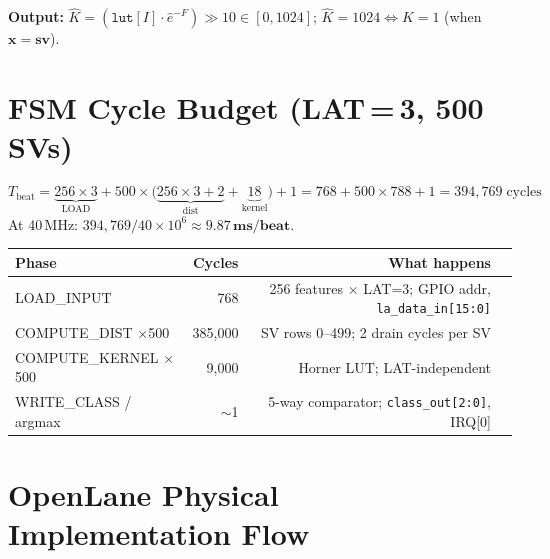 \documentclass[10pt]{article}
\begin{document}
\textbf{Output:} $\hat{K} = (\texttt{lut}[I]\cdot\hat{e}^{-F})\gg 10 \in [0,1024]$;
$\hat{K}=1024 \Leftrightarrow K=1$ (when $\mathbf{x}=\mathbf{sv}$).

\section{FSM Cycle Budget (LAT\,=\,3, 500 SVs)}

\[
T_{\text{beat}} = \underbrace{256\times3}_{\text{LOAD}}
+ 500\times\!\bigl(\underbrace{256\times3+2}_{\text{dist}}
+ \underbrace{18}_{\text{kernel}}\bigr) + 1
= 768 + 500\times 788 + 1 = 394{,}769\;\text{cycles}
\]
At 40\,MHz: $394{,}769/40\times10^6 \approx \mathbf{9.87\,ms/beat}$.

\begin{center}
\small
\begin{tabular}{lrrl}
\toprule
Phase & Cycles & What happens \\
\midrule
LOAD\_INPUT & 768 & 256 features $\times$ LAT=3; GPIO addr, \texttt{la\_data\_in[15:0]} \\
COMPUTE\_DIST $\times$500 & 385,000 & SV rows 0--499; 2 drain cycles per SV \\
COMPUTE\_KERNEL $\times$500 & 9,000 & Horner LUT; LAT-independent \\
WRITE\_CLASS / argmax & $\sim$1 & 5-way comparator; \texttt{class\_out[2:0]}, IRQ[0] \\
\bottomrule
\end{tabular}
\end{center}

\section{OpenLane Physical Implementation Flow}
\end{document}
